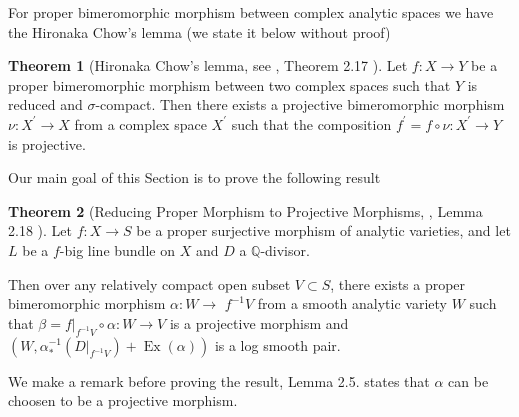 \documentclass[11pt]{article}
\theoremstyle{definition}
\newtheorem{theorem}{Theorem}
\begin{document}
	For proper bimeromorphic morphism between complex analytic spaces we have the Hironaka Chow's lemma (we state it below without proof)
	\begin{theorem}[Hironaka Chow's lemma, see \cite{DasHacon}, Theorem 2.17 ]
		Let $f: X \rightarrow Y$ be a proper bimeromorphic morphism between two complex spaces such that $Y$ is reduced and $\sigma$-compact. Then there exists a projective bimeromorphic morphism $\nu: X^{\prime} \rightarrow X$ from a complex space $X^{\prime}$ such that the composition $f^{\prime}=f \circ \nu: X^{\prime} \rightarrow Y$ is projective.
	\end{theorem}
	
	Our main goal of this Section is to prove the following result
	\begin{theorem}[Reducing Proper Morphism to Projective Morphisms, \cite{DasHacon}, Lemma 2.18 ]
		Let $f: X \rightarrow S$ be a proper surjective morphism of analytic varieties, and let $L$ be a $f$-big line bundle on $X$ and $D$ a $\mathbb{Q}$-divisor. 
		
		Then over any relatively compact open subset $V \subset S$, there exists a proper bimeromorphic morphism $\alpha: W \rightarrow$ $f^{-1} V$ from a smooth analytic variety $W$ such that $\beta=\left.f\right|_{f^{-1} V} \circ \alpha: W \rightarrow V$ is a projective morphism and $\left(W, \alpha_*^{-1}\left(\left.D\right|_{f^{-1} V}\right)+\operatorname{Ex}(\alpha)\right)$ is a log smooth pair.
	\end{theorem}
	We make a remark before proving the result, \cite{ClaudonHoring} Lemma 2.5. states that $\alpha$ can be choosen to be a projective morphism.
\end{document}
